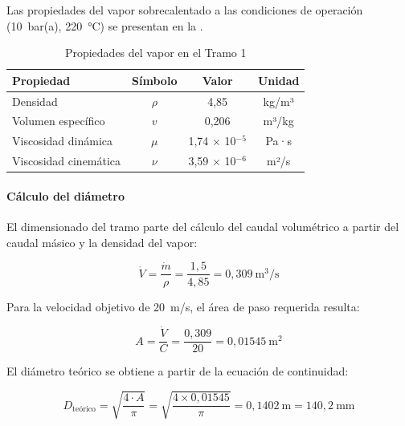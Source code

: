 \documentclass[12pt]{article}
\begin{document}
Las propiedades del vapor sobrecalentado a las condiciones de operación (10~bar(a), 220~°C) se presentan en la .

\begin{table}[H]
	\centering
	\caption{Propiedades del vapor en el Tramo 1}
	\label{tab:propiedades-vapor-tramo1}
	\begin{tabular}{lccc}
		\toprule
		\textbf{Propiedad}    & \textbf{Símbolo} & \textbf{Valor}          & \textbf{Unidad} \\
		\midrule
		Densidad              & $\rho$           & 4,85                    & kg/m³           \\
		Volumen específico    & $v$              & 0,206                   & m³/kg           \\
		Viscosidad dinámica   & $\mu$            & 1,74 $\times$ 10$^{-5}$ & Pa·s            \\
		Viscosidad cinemática & $\nu$            & 3,59 $\times$ 10$^{-6}$ & m²/s            \\
		\bottomrule
	\end{tabular}
\end{table}

\paragraph{Cálculo del diámetro}

El dimensionado del tramo parte del cálculo del caudal volumétrico a partir del caudal másico y la densidad del vapor:

\begin{equation}
	\dot{V} = \frac{\dot{m}}{\rho} = \frac{1{,}5}{4{,}85} = 0{,}309 \ \text{m}^3\text{/s}
	\label{eq:caudal-volumetrico-tramo1}
\end{equation}

Para la velocidad objetivo de 20~m/s, el área de paso requerida resulta:

\begin{equation}
	A = \frac{\dot{V}}{C} = \frac{0{,}309}{20} = 0{,}01545 \ \text{m}^2
	\label{eq:area-paso-tramo1}
\end{equation}

El diámetro teórico se obtiene a partir de la ecuación de continuidad:

\begin{equation}
	D_{\text{teórico}} = \sqrt{\frac{4 \cdot A}{\pi}} = \sqrt{\frac{4 \times 0{,}01545}{\pi}} = 0{,}1402 \ \text{m} = 140{,}2 \ \text{mm}
	\label{eq:diametro-teorico-tramo1}
\end{equation}
\end{document}
